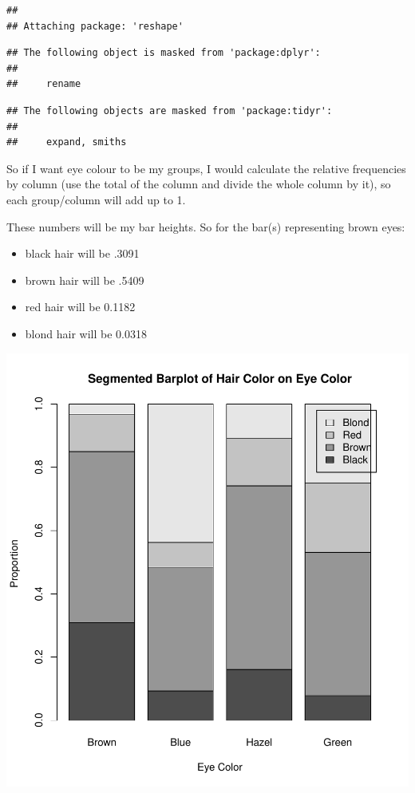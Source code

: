 \documentclass[
]{book}
\begin{document}
\begin{verbatim}
## 
## Attaching package: 'reshape'
\end{verbatim}

\begin{verbatim}
## The following object is masked from 'package:dplyr':
## 
##     rename
\end{verbatim}

\begin{verbatim}
## The following objects are masked from 'package:tidyr':
## 
##     expand, smiths
\end{verbatim}

So if I want eye colour to be my groups, I would calculate the relative
frequencies by column (use the total of the column and divide the whole
column by it), so each group/column will add up to 1.

These numbers will be my bar heights. So for the bar(s) representing
brown eyes:

\begin{itemize}
\item
  black hair will be .3091
\item
  brown hair will be .5409
\item
  red hair will be 0.1182
\item
  blond hair will be 0.0318
\end{itemize}

\includegraphics{_main_files/figure-latex/unnamed-chunk-9-1.pdf}
\end{document}
